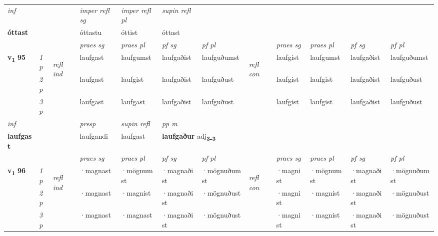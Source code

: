 \begin{longtable}[l]{X>{\footnotesize\itshape}llXXXXlXXXX}
   {\textit{inf}} & &   & \textit{imper refl sg} & \textit{imper refl pl}   & \textit{supin refl}  \\*
  {\textbf{óttast}} & &   & óttastu & óttist   & óttast  \\*

\midrule

 & &   & \textit{praes sg}  & \textit{praes pl}    & \textit{ pf sg} & \textit{pf pl} & & \textit{praes sg}  & \textit{praes pl}    & \textit{pf sg} & \textit{pf pl }  \\ \cmidrule{4-7} \cmidrule{9-12}
 \multirow{2}{*}{{{\textbf{v{\textsubscript{1}}} \Large{\textbf{95}}}}}  & 1p & \multirow{3}{*}{\begin{turn}{90}\textit{refl ind}\end{turn}}  & laufgast & laufgumst & laufgaðist & laufguðumst & \multirow{3}{*}{\begin{turn}{90}\textit{refl con}\end{turn}}  &laufgist & laufgumst & laufgaðist & laufguðumst \\*
 & 2p &  & laufgast & laufgist & laufgaðist & laufguðust & &laufgist & laufgist & laufgaðist & laufguðust \\*
 & 3p  & & laufgast & laufgast & laufgaðist & laufguðust & & laufgist & laufgist& laufgaðist & laufguðust \\*
\cmidrule{4-7} \cmidrule{9-12}

   {\textit{inf}} & &     & \textit{presp}  & \textit{supin refl} & \textit{pp m} \\*
  {\textbf{laufgast}} & &     & laufgandi  & laufgast & \multicolumn{2}{l}{\textbf{laufgaður} adj\textbf{\textsubscript{3-3}}} \\*

\midrule

 & &   & \textit{praes sg}  & \textit{praes pl}    & \textit{ pf sg} & \textit{pf pl} & & \textit{praes sg}  & \textit{praes pl}    & \textit{pf sg} & \textit{pf pl }  \\ \cmidrule{4-7} \cmidrule{9-12}
 \multirow{2}{*}{{{\textbf{v{\textsubscript{1}}} \Large{\textbf{96}}}}}  & 1p & \multirow{3}{*}{\begin{turn}{90}\textit{refl ind}\end{turn}}  & ·magnast & ·mögnumst & ·magnaðist & ·mögnuðumst & \multirow{3}{*}{\begin{turn}{90}\textit{refl con}\end{turn}}  &·magnist & ·mögnumst & ·magnaðist & ·mögnuðumst \\*
 & 2p &  & ·magnast & ·magnist & ·magnaðist & ·mögnuðust & &·magnist & ·magnist & ·magnaðist & ·mögnuðust \\*
 & 3p  & & ·magnast & ·magnast & ·magnaðist & ·mögnuðust & & ·magnist & ·magnist& ·magnaðist & ·mögnuðust \\*
\cmidrule{4-7} \cmidrule{9-12}


\end{longtable}
